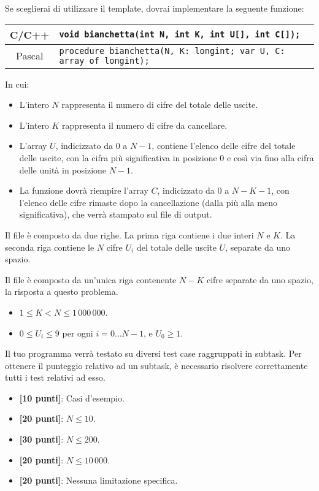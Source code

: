 Se sceglierai di utilizzare il template, dovrai implementare la seguente funzione:
\begin{center}\begin{tabularx}{\textwidth}{|c|X|}
\hline
C/C++  & \verb|void bianchetta(int N, int K, int U[], int C[]);|\\
\hline
Pascal & \verb|procedure bianchetta(N, K: longint; var U, C: array of longint);|\\
\hline
\end{tabularx}\end{center}
In cui:
\begin{itemize}[nolistsep]
  \item L'intero $N$ rappresenta il numero di cifre del totale delle uscite.
  \item L'intero $K$ rappresenta il numero di cifre da cancellare.
  \item L'array $U$, indicizzato da $0$ a $N-1$, contiene l'elenco delle cifre del totale delle uscite, con la cifra più significativa in posizione $0$ e così via fino alla cifra delle unità in posizione $N-1$.
  \item La funzione dovrà riempire l'array $C$, indicizzato da $0$ a $N-K-1$, con l'elenco delle cifre rimaste dopo la cancellazione (dalla più alla meno significativa), che verrà stampato sul file di output.
\end{itemize}

\InputFile
Il file  è composto da due righe. La prima riga contiene i due interi $N$ e $K$. La seconda riga contiene le $N$ cifre $U_i$ del totale delle uscite $U$, separate da uno spazio.

\OutputFile
Il file \outputfile{} è composto da un'unica riga contenente $N-K$ cifre separate da uno spazio, la risposta a questo problema.

\pagebreak
\Constraints
\begin{itemize}[nolistsep, itemsep=2mm]
	\item $1 \le K < N \le 1\,000\,000$.
	\item $0 \le U_i \le 9$ per ogni $i = 0 \ldots N-1$, e $U_0 \ge 1$.
\end{itemize}

\Scoring
Il tuo programma verrà testato su diversi test case raggruppati in subtask.
Per ottenere il punteggio relativo ad un subtask, è necessario risolvere
correttamente tutti i test relativi ad esso.

\begin{itemize}[nolistsep,itemsep=2mm]
  \item \textbf{ [10 punti]}: Casi d'esempio.
  \item \textbf{ [20 punti]}: $N \leq 10$.
  \item \textbf{ [30 punti]}: $N \leq 200$.
  \item \textbf{ [20 punti]}: $N \leq 10\,000$.
  \item \textbf{ [20 punti]}: Nessuna limitazione specifica.
\end{itemize}

